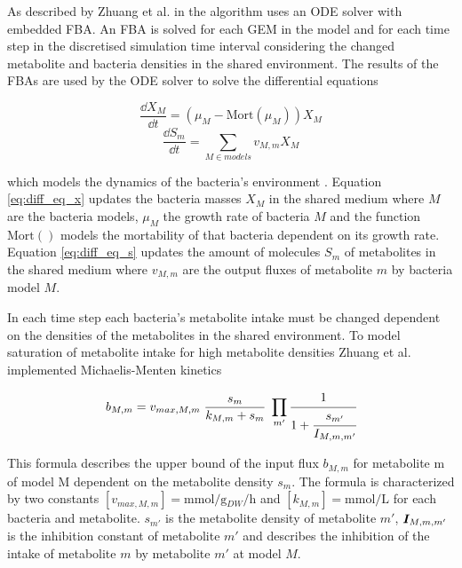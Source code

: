 As described by Zhuang et al. in \cite{zhuang_genome-scale_2011} the algorithm uses an ODE solver with embedded FBA. An FBA is solved
for each GEM in the model and for each time step in the discretised simulation time interval considering the changed metabolite and
bacteria densities in the shared environment. The results of the FBAs are used by the ODE solver to solve the differential equations

\begin{equation} \label{eq:diff_eq_x}
	\frac{\dd X_M}{\dd t} = (\mu_M - \mathrm{Mort}(\mu_M)) X_M
\end{equation}
\begin{equation} \label{eq:diff_eq_s}
	\frac{\dd S_m}{\dd t} = \displaystyle\sum_{M \in models} v_{M,m} X_M
\end{equation}

which models the dynamics of the bacteria's environment \cite{zhuang_design_2012}. Equation \ref{eq:diff_eq_x} updates
the bacteria masses $X_M$ in the shared medium where $M$ are the bacteria models, $\mu_M$ the growth rate of bacteria $M$ and the function
$\mathrm{Mort}()$ models the mortability of that bacteria dependent on its growth rate.
Equation \ref{eq:diff_eq_s} updates the amount of molecules $S_m$ of metabolites in the shared medium where $v_{M,m}$ are the
output fluxes of metabolite $m$ by bacteria model $M$.

In each time step each bacteria's metabolite intake must be changed dependent on the densities of the metabolites in the shared environment.
To model saturation of metabolite intake for high metabolite densities Zhuang et al. implemented Michaelis-Menten kinetics \cite{johnson2011original}

\begin{equation} \label{eq:michaelis-menten}
 b_{M,m} = v_{max,M,m} \; \frac{s_m}{k_{M,m}+s_m} \; \prod_{m'} \cfrac{1}{1+\cfrac{s_{m'}}{I_{M,m,m'}}}
\end{equation}

This formula describes the upper bound of the input flux $b_{M,m}$ for metabolite m of model M dependent on the metabolite density
$s_m$. The formula is characterized by two constants $\left[ v_{max,M,m} \right] = \si{\milli\mole\per\gram_{DW}\per\hour}$ and $\left[ k_{M,m} \right] = \si{\milli\mole\per\liter}$
for each bacteria and metabolite. $s_{m'}$ is the metabolite density of metabolite $m'$, $\bm{I}_{M,m,m'}$ is the inhibition constant of metabolite $m'$ and
describes the inhibition of the intake of metabolite $m$ by metabolite $m'$ at model $M$.

